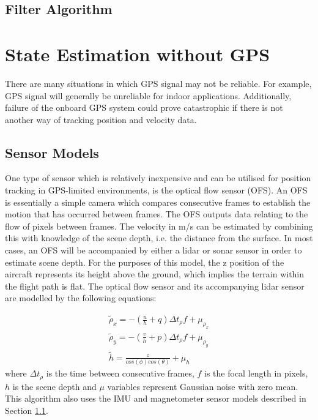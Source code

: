 \subsection{Filter Algorithm}

\section{State Estimation without GPS}
There are many situations in which GPS signal may not be reliable. For example, GPS signal will generally be unreliable for indoor applications. Additionally, failure of the onboard GPS system could prove catastrophic if there is not another way of tracking position and velocity data.
\subsection{Sensor Models}\label{section:GPSSensModels}
One type of sensor which is relatively inexpensive and can be utilised for position tracking in GPS-limited environments, is the optical flow sensor (OFS). An OFS is essentially a simple camera which compares consecutive frames to establish the motion that has occurred between frames. The OFS outputs data relating to the flow of pixels between frames. The velocity in m/s can be estimated by combining this with knowledge of the scene depth, i.e. the distance from the surface. In most cases, an OFS will be accompanied by either a lidar or sonar sensor in order to estimate scene depth. For the purposes of this model, the z position of the aircraft represents its height above the ground, which implies the terrain within the flight path is flat. The optical flow sensor and its accompanying lidar sensor are modelled by the following equations\cite{Driessen2018}\cite{Ding2010}:


\begin{equation}\label{eqn:OFS}
\begin{split}
\tilde{\rho}_{x}=-\left(\frac{u}{h}+q\right)\Delta t_{\rho}f+\mu_{\rho_{x}}\\
\tilde{\rho}_{y}=-\left(\frac{v}{h}+p\right)\Delta t_{\rho}f+\mu_{\rho_{y}}\\
\tilde{h}=\frac{z}{cos(\phi)cos(\theta)}+\mu_{h}
\end{split}
\end{equation}
where $\Delta t_{\rho}$ is the time between consecutive frames, $f$ is the focal length in pixels, $h$ is the scene depth and $\mu$ variables represent Gaussian noise with zero mean.\\
This algorithm also uses the IMU and magnetometer sensor models described in Section \ref{section:GPSSensModels}.







